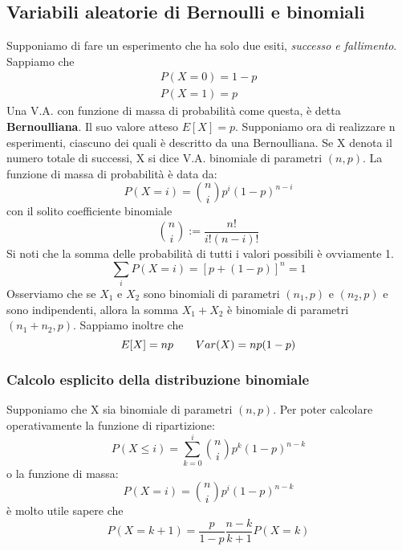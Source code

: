 \documentclass[11pt]{article}
\begin{document}
\subsection{Variabili aleatorie di Bernoulli e binomiali}
Supponiamo di fare un esperimento che ha solo due esiti, \textit{successo e fallimento}. Sappiamo che
\begin{gather*}
    P(X=0)=1-p\\ 
    P(X=1)=p
\end{gather*}
Una V.A. con funzione di massa di probabilità come questa, è detta \textbf{Bernoulliana}. Il suo valore atteso $E[X] = p$.
Supponiamo ora di realizzare n esperimenti, ciascuno dei quali è descritto da una Bernoulliana. Se X denota il numero totale di successi, X si dice V.A. binomiale di parametri $(n,p)$. La funzione di massa di probabilità è data da:
\begin{displaymath}
    P(X=i)={n \choose i} p^i(1-p)^{n-i}
\end{displaymath}
con il solito coefficiente binomiale
\begin{displaymath}
    {n \choose i} := \frac{n!}{i!(n-i)!}
\end{displaymath}
Si noti che la somma delle probabilità di tutti i valori possibili è ovviamente 1.
\begin{displaymath}
    \sum_iP(X=i)=[p+(1-p)]^n=1
\end{displaymath}
Osserviamo che se $X_1$ e $X_2$ sono binomiali di parametri $(n_1,p)$ e $(n_2,p)$ e sono indipendenti, allora la somma $X_1+X_2$ è binomiale di parametri $(n_1+n_2,p)$.
Sappiamo inoltre che
\begin{displaymath}
    E[X]=np\hspace{20px}Var(X)=np(1-p)
\end{displaymath}
\subsubsection{Calcolo esplicito della distribuzione binomiale}
Supponiamo che X sia binomiale di parametri $(n,p)$. Per poter calcolare operativamente la funzione di ripartizione:
\begin{displaymath}
    P(X\le i) = \sum_{k=0}^i {n \choose i} p^k (1-p)^{n-k}
\end{displaymath}
o la funzione di massa:
\begin{displaymath}
    P(X=i) = {n \choose i} p^i(1-p)^{n-k}
\end{displaymath}
è molto utile sapere che 
\begin{displaymath}
    P(X=k+1)=\frac{p}{1-p}\frac{n-k}{k+1}P(X=k)
\end{displaymath}
\end{document}
